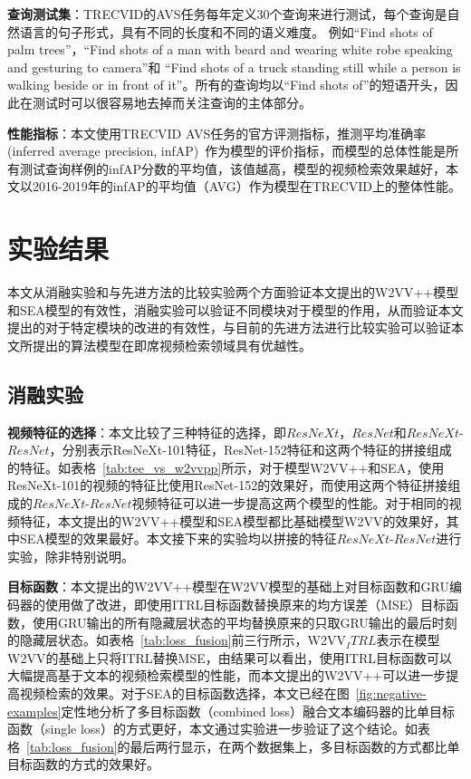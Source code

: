 \textbf{查询测试集}：TRECVID的AVS任务每年定义30个查询来进行测试，每个查询是自然语言的句子形式，具有不同的长度和不同的语义难度。
例如“Find shots of palm trees”，“Find shots of a man with beard and wearing white robe speaking and gesturing to camera”和
“Find shots of a truck standing still while a person is walking beside or in front of it”。所有的查询均以“Find shots of”的短语开头，因此在测试时可以很容易地去掉而关注查询的主体部分。

\textbf{性能指标}：本文使用TRECVID AVS任务的官方评测指标，推测平均准确率(inferred average precision, infAP)~\cite{awad2016trecvid,awad2017trecvid,awad2018trecvid,awad2019trecvid}作为模型的评价指标，而模型的总体性能是所有测试查询样例的infAP分数的平均值，该值越高，模型的视频检索效果越好，本文以2016-2019年的infAP的平均值（AVG）作为模型在TRECVID上的整体性能。


\section{实验结果}
本文从消融实验和与先进方法的比较实验两个方面验证本文提出的W2VV++模型和SEA模型的有效性，消融实验可以验证不同模块对于模型的作用，从而验证本文提出的对于特定模块的改进的有效性，与目前的先进方法进行比较实验可以验证本文所提出的算法模型在即席视频检索领域具有优越性。

\subsection{消融实验}
\textbf{视频特征的选择}：本文比较了三种特征的选择，即$ResNeXt$，$ResNet$和$ResNeXt$-$ResNet$，分别表示ResNeXt-101特征，ResNet-152特征和这两个特征的拼接组成的特征。如表格~\ref{tab:tee_vs_w2vvpp}所示，对于模型W2VV++和SEA，使用ResNeXt-101的视频的特征比使用ResNet-152的效果好，而使用这两个特征拼接组成的$ResNeXt$-$ResNet$视频特征可以进一步提高这两个模型的性能。对于相同的视频特征，本文提出的W2VV++模型和SEA模型都比基础模型W2VV的效果好，其中SEA模型的效果最好。本文接下来的实验均以拼接的特征$ResNeXt$-$ResNet$进行实验，除非特别说明。



\textbf{目标函数}：本文提出的W2VV++模型在W2VV模型的基础上对目标函数和GRU编码器的使用做了改进，即使用ITRL目标函数替换原来的均方误差（MSE）目标函数，使用GRU输出的所有隐藏层状态的平均替换原来的只取GRU输出的最后时刻的隐藏层状态。如表格~\ref{tab:loss_fusion}前三行所示，W2VV$_ITRL$表示在模型W2VV的基础上只将ITRL替换MSE，由结果可以看出，使用ITRL目标函数可以大幅提高基于文本的视频检索模型的性能，而本文提出的W2VV++可以进一步提高视频检索的效果。对于SEA的目标函数选择，本文已经在图~\ref{fig:negative-examples}定性地分析了多目标函数（combined loss）融合文本编码器的比单目标函数（single loss）的方式更好，本文通过实验进一步验证了这个结论。如表格~\ref{tab:loss_fusion}的最后两行显示，在两个数据集上，多目标函数的方式都比单目标函数的方式的效果好。

